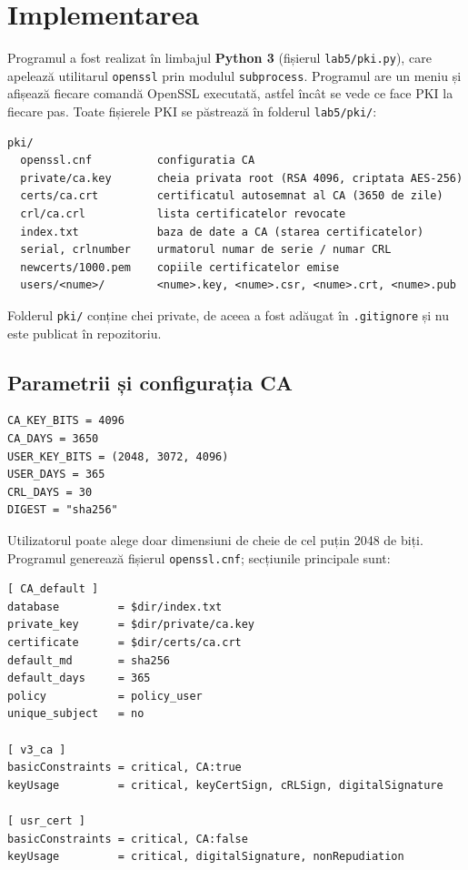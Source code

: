 \documentclass[12pt,a4paper]{article}
\begin{document}
\section{Implementarea}

Programul a fost realizat în limbajul \textbf{Python 3} (fișierul
\texttt{lab5/pki.py}), care apelează utilitarul \texttt{openssl} prin modulul
\texttt{subprocess}. Programul are un meniu și afișează fiecare comandă OpenSSL
executată, astfel încât se vede ce face PKI la fiecare pas. Toate fișierele PKI
se păstrează în folderul \texttt{lab5/pki/}:

\begin{lstlisting}[style=config, caption={Structura folderului PKI}]
pki/
  openssl.cnf          configuratia CA
  private/ca.key       cheia privata root (RSA 4096, criptata AES-256)
  certs/ca.crt         certificatul autosemnat al CA (3650 de zile)
  crl/ca.crl           lista certificatelor revocate
  index.txt            baza de date a CA (starea certificatelor)
  serial, crlnumber    urmatorul numar de serie / numar CRL
  newcerts/1000.pem    copiile certificatelor emise
  users/<nume>/        <nume>.key, <nume>.csr, <nume>.crt, <nume>.pub
\end{lstlisting}

Folderul \texttt{pki/} conține chei private, de aceea a fost adăugat în
\texttt{.gitignore} și nu este publicat în repozitoriu.

\subsection{Parametrii și configurația CA}

\begin{lstlisting}[caption={Parametrii impuși de sarcină}]
CA_KEY_BITS = 4096
CA_DAYS = 3650
USER_KEY_BITS = (2048, 3072, 4096)
USER_DAYS = 365
CRL_DAYS = 30
DIGEST = "sha256"
\end{lstlisting}

Utilizatorul poate alege doar dimensiuni de cheie de cel puțin 2048 de biți.
Programul generează fișierul \texttt{openssl.cnf}; secțiunile principale sunt:

\begin{lstlisting}[style=config, caption={Fragment din \texttt{openssl.cnf}}]
[ CA_default ]
database         = $dir/index.txt
private_key      = $dir/private/ca.key
certificate      = $dir/certs/ca.crt
default_md       = sha256
default_days     = 365
policy           = policy_user
unique_subject   = no

[ v3_ca ]
basicConstraints = critical, CA:true
keyUsage         = critical, keyCertSign, cRLSign, digitalSignature

[ usr_cert ]
basicConstraints = critical, CA:false
keyUsage         = critical, digitalSignature, nonRepudiation
\end{lstlisting}
\end{document}
